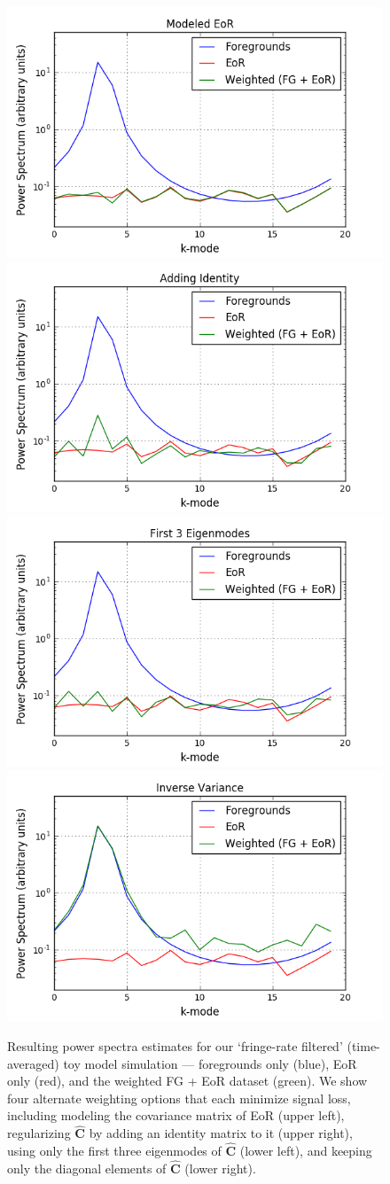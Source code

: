 \documentclass[preprint2,numberedappendix,tighten]{aastex6}  %
\begin{document}
\begin{figure}
	\centering
	\includegraphics[trim={0.4cm 0cm 1.3cm 0cm},clip,height=0.3\textwidth]{plots/toy_sigloss10.png}
	\includegraphics[trim={1cm 0cm 1.3cm 0cm},clip,height=0.3\textwidth]{plots/toy_sigloss8.png}
	\includegraphics[trim={0.4cm 0cm 1.3cm 0cm},clip,height=0.3\textwidth]{plots/toy_sigloss9.png}
	\includegraphics[trim={1cm 0cm 1.3cm 0cm},clip,height=0.3\textwidth]{plots/toy_sigloss11.png}
	\caption{Resulting power spectra estimates for our `fringe-rate filtered' (time-averaged) toy model simulation --- foregrounds only (blue), 
EoR only (red), and the weighted FG + EoR dataset (green). We show four alternate weighting options that each minimize signal 
loss, including modeling the covariance matrix of EoR (upper left), regularizing $\hat{\textbf{C}}$ by adding an identity matrix to 
it (upper right), using only the first three eigenmodes of $\hat{\textbf{C}}$ (lower left), and keeping only the diagonal elements of 
$\hat{\textbf{C}}$ (lower right).}
	\label{fig:toy_sigloss8}
\end{figure}
\end{document}
